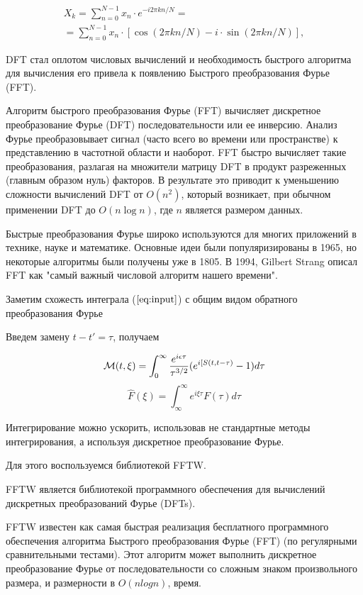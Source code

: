 \documentclass[%
bachelor,    %
natbib,      %
subf,        %
href,        %
colorlinks,  %
]{disser}
\newcommand{\cM}{\mathcal{M}}
\begin{document}
\begin{eqnarray}
X_{k}=\sum _{n=0}^{N-1}x_{n}\cdot e^{-i2\pi kn/N}= \nonumber \\
=\sum _{n=0}^{N-1}x_{n}\cdot [\cos(2\pi kn/N)-i\cdot \sin(2\pi kn/N)]\nonumber,
\end{eqnarray}


DFT стал оплотом числовых вычислений и необходимость быстрого алгоритма для вычисления его привела к появлению Быстрого преобразования Фурье (FFT).

Алгоритм быстрого преобразования Фурье (FFT) вычисляет дискретное преобразование Фурье (DFT) последовательности или ее инверсию. Анализ Фурье преобразовывает сигнал (часто всего во времени или пространстве) к представлению в частотной области и наоборот. FFT быстро вычисляет такие преобразования, разлагая на множители матрицу DFT в продукт разреженных (главным образом нуль) факторов. В результате это приводит к уменьшению сложности вычислений DFT от $ O (n^ {2})$, который возникает, при обычном применении DFT до $O (n\log n)$, где $ n $  является размером данных.

Быстрые преобразования Фурье широко используются для многих приложений в технике, науке и математике. Основные идеи были популяризированы в 1965, но некоторые алгоритмы были получены уже в 1805. В 1994, Gilbert Strang описал FFT как "самый важный числовой алгоритм нашего времени".

Заметим схожесть интеграла ($\ref{eq:input}$) с общим видом обратного преобразования Фурье

Введем замену $t - t' = \tau$, получаем

\begin{equation}\label{eq:fourier}
	\cM (t, \xi) = \int_{0}^{\infty}\frac{e^{i\epsilon \tau}}{{\tau}^{3/2}}(e^{i [S(t, t-\tau)} - 1) d\tau\\ 
\end{equation}
$$\hat{F}(\xi) = \int_{\infty}^{\infty}e^{i\xi \tau} F(\tau) d\tau $$

Интегрирование можно ускорить, использовав не стандартные методы интегрирования, а используя дискретное преобразование Фурье.

Для этого воспользуемся библиотекой FFTW.

FFTW является библиотекой программного обеспечения для вычислений дискретных преобразований Фурье (DFTs).\cite{fftw:website}

FFTW известен как самая быстрая реализация бесплатного программного обеспечения алгоритма Быстрого преобразования Фурье (FFT) (по регулярными сравнительными тестами). Этот алгоритм может выполнить дискретное преобразование Фурье от последовательности со сложным знаком произвольного размера, и размерности в $O (n log n)$, время.
\end{document}
